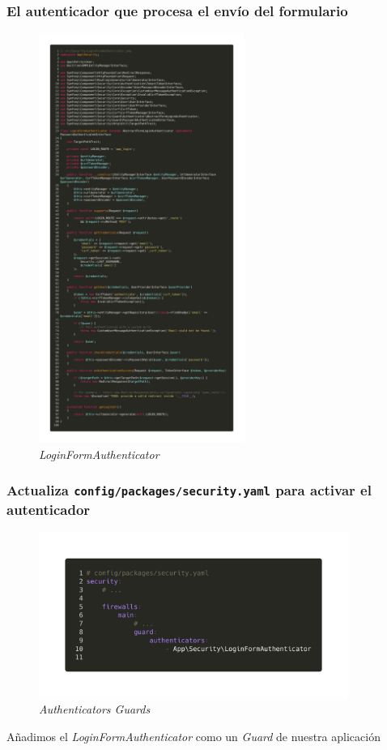 \subsubsection{El autenticador que procesa el envío del formulario}

\begin{figure}[ht]
  \centering
  \includegraphics[width=0.6\textwidth]{../assets/login_form_authenticator.png}
  \caption{\textit{LoginFormAuthenticator}}
  \label{fig:login_form_authenticator}
\end{figure}

\clearpage
\subsubsection{Actualiza \textbf{\texttt{config/packages/security.yaml}} para activar el autenticador}

\begin{figure}[ht]
  \centering
  \includegraphics[width=0.9\textwidth]{../assets/authenticator_yml.png}
  \caption{\textit{Authenticators Guards}}
  \label{fig:authenticator_yml}
\end{figure}
Añadimos el \textit{LoginFormAuthenticator} como un \textit{Guard} de nuestra aplicación

